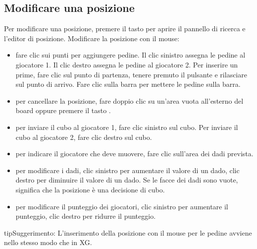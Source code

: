 \documentclass[letterpaper,10pt,italian]{sphinxmanual}
\begin{document}
\subsection{Modificare una posizione}
\label{\detokenize{guide_utilisateur:editer-une-position}}\label{\detokenize{guide_utilisateur:guide-edit-position}}
\sphinxAtStartPar
Per modificare una posizione, premere il tasto  per aprire il pannello di ricerca e l’editor di posizione. Modificare la posizione con il mouse:
\begin{itemize}
\item {} 
\sphinxAtStartPar
fare clic sui punti per aggiungere pedine. Il clic sinistro assegna le pedine al giocatore 1. Il clic destro assegna le pedine al giocatore 2. Per inserire un prime, fare clic sul punto di partenza, tenere premuto il pulsante e rilasciare sul punto di arrivo. Fare clic sulla barra per mettere le pedine sulla barra.

\item {} 
\sphinxAtStartPar
per cancellare la posizione, fare doppio clic su un’area vuota all’esterno del board oppure premere il tasto .

\item {} 
\sphinxAtStartPar
per inviare il cubo al giocatore 1, fare clic sinistro sul cubo. Per inviare il cubo al giocatore 2, fare clic destro sul cubo.

\item {} 
\sphinxAtStartPar
per indicare il giocatore che deve muovere, fare clic sull’area dei dadi prevista.

\item {} 
\sphinxAtStartPar
per modificare i dadi, clic sinistro per aumentare il valore di un dado, clic destro per diminuire il valore di un dado. Se le facce dei dadi sono vuote, significa che la posizione è una decisione di cubo.

\item {} 
\sphinxAtStartPar
per modificare il punteggio dei giocatori, clic sinistro per aumentare il punteggio, clic destro per ridurre il punteggio.

\end{itemize}

\begin{sphinxadmonition}{tip}{Suggerimento:}
\sphinxAtStartPar
L’inserimento della posizione con il mouse per le pedine avviene nello stesso modo che in XG.
\end{sphinxadmonition}
\end{document}
